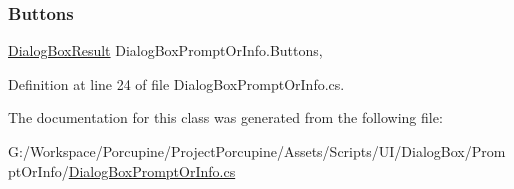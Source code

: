 \subsubsection{\texorpdfstring{Buttons}{Buttons}}
{\footnotesize\ttfamily \hyperlink{_dialog_box_result_8cs_acd933b66f7b1c8ad36ee61780622c54f}{Dialog\+Box\+Result} Dialog\+Box\+Prompt\+Or\+Info.\+Buttons\hspace{0.3cm}{\ttfamily [get]}, {\ttfamily [set]}}



Definition at line 24 of file Dialog\+Box\+Prompt\+Or\+Info.\+cs.



The documentation for this class was generated from the following file\+:\begin{DoxyCompactItemize}
\item 
G\+:/\+Workspace/\+Porcupine/\+Project\+Porcupine/\+Assets/\+Scripts/\+U\+I/\+Dialog\+Box/\+Prompt\+Or\+Info/\hyperlink{_dialog_box_prompt_or_info_8cs}{Dialog\+Box\+Prompt\+Or\+Info.\+cs}\end{DoxyCompactItemize}
